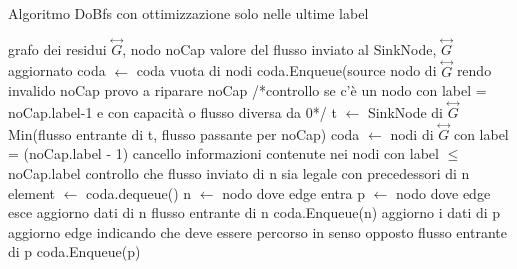 \documentclass{article}
\begin{document}
\begin{algorithm}
\caption{Algoritmo DoBfs con ottimizzazione solo nelle ultime label}
\begin{algorithmic}
\REQUIRE grafo dei residui $\overset{\leftrightarrow}{G}$, nodo noCap
\ENSURE valore del flusso inviato al SinkNode, $\overset{\leftrightarrow}{G}$ aggiornato
\STATE coda $\leftarrow$ coda vuota di nodi
\STATE coda.Enqueue(source nodo di $\overset{\leftrightarrow}{G}$
\ELSE
\STATE rendo invalido noCap
\STATE provo a riparare noCap /*controllo se c'è un nodo con label = noCap.label-1 e con capacità o flusso diversa da 0*/
\STATE t $\leftarrow$ SinkNode di $\overset{\leftrightarrow}{G}$
\RETURN Min(flusso entrante di t, flusso passante per noCap)
\ENDIF
\STATE coda $\leftarrow$ nodi di $\overset{\leftrightarrow}{G}$ con label = (noCap.label - 1)
\STATE cancello informazioni contenute nei nodi con label $\leq$ noCap.label
\STATE controllo che flusso inviato di n sia legale con precedessori di n
\ENDFOR
\ENDIF
{}
\STATE element  $\leftarrow$ coda.dequeue()
\STATE n $\leftarrow$ nodo dove edge entra
\STATE p $\leftarrow$ nodo dove edge esce
\STATE aggiorno dati di n 
\RETURN flusso entrante di n
\ELSE
\STATE coda.Enqueue(n)
\ENDIF
{}
\STATE aggiorno i dati di p
\STATE aggiorno edge indicando che deve essere percorso in senso opposto
\RETURN flusso entrante di p
\ELSE
\STATE coda.Enqueue(p)
\ENDIF
\ENDIF
\ENDIF
\ENDIF
\ENDFOR
\ENDWHILE
{}
\end{algorithmic}
\end{algorithm} 
\end{document}
